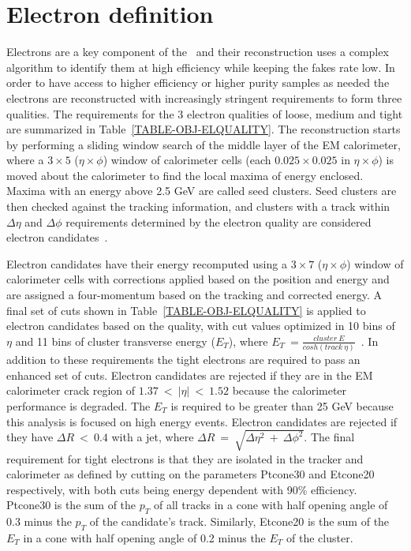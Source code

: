 \section{Electron definition}
\label{SECTION-OBJ-EL}
Electrons are a key component of the \Wprimechan\ and their reconstruction uses a complex algorithm to identify them at high efficiency while keeping the fakes rate low. In order to have access to higher efficiency or higher purity samples as needed the electrons are reconstructed with increasingly stringent requirements to form three qualities. The requirements for the 3 electron qualities of loose, medium and tight are summarized in Table~\ref{TABLE-OBJ-ELQUALITY}. The reconstruction starts by performing a sliding window search of the middle layer of the EM calorimeter, where a $3 \times 5$ ($\eta \times \phi$) window of calorimeter cells (each $0.025 \times 0.025$ in $\eta \times \phi$) is moved about the calorimeter to find the local maxima of energy enclosed. Maxima with an energy above 2.5 GeV are called seed clusters. Seed clusters are then checked against the tracking information, and clusters with a track within $\Delta\eta$ and $\Delta\phi$ requirements determined by the electron quality are considered electron candidates~\cite{Electrons}.

Electron candidates have their energy recomputed using a $3 \times 7$ ($\eta \times \phi$) window of calorimeter cells with corrections applied based on the position and energy and are assigned a four-momentum based on the tracking and corrected energy. A final set of cuts shown in Table~\ref{TABLE-OBJ-ELQUALITY} is applied to electron candidates based on the quality, with cut values optimized in 10 bins of $\eta$ and 11 bins of cluster transverse energy ($E_{T}$), where $E_T\ = \frac{cluster\ E}{cosh(track\ \eta)}$~\cite{Electrons}. In addition to these requirements the tight electrons are required to pass an enhanced set of cuts. Electron candidates are rejected if they are in the EM calorimeter crack region of $1.37\ <\ |\eta|\ <\ 1.52$ because the calorimeter performance is degraded. The $E_T$ is required to be greater than 25 GeV because this analysis is focused on high energy events. Electron candidates are rejected if they have $\Delta R\ <\ 0.4$ with a jet, where $\Delta R\ =\ \sqrt{\Delta\eta^2\ +\ \Delta\phi^2}$. The final requirement for tight electrons is that they are isolated in the tracker and calorimeter as defined by cutting on the parameters Ptcone30 and Etcone20 respectively, with both cuts being energy dependent with 90\% efficiency. Ptcone30 is the sum of the $p_T$ of all tracks in a cone with half opening angle of 0.3 minus the $p_T$ of the candidate's track. Similarly, Etcone20 is the sum of the $E_T$ in a cone with half opening angle of 0.2 minus the $E_T$ of the cluster. 

